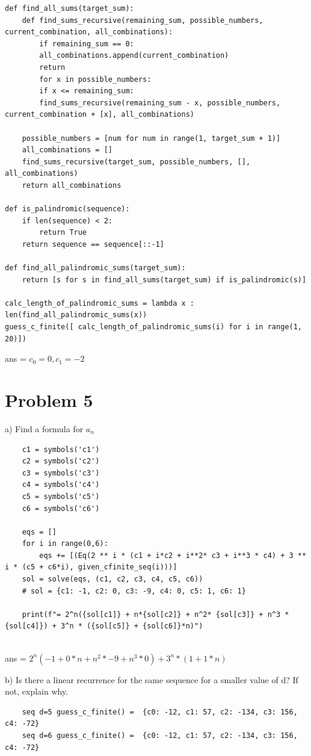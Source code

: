\documentclass{article}
\begin{document}
\begin{lstlisting}
def find_all_sums(target_sum):
	def find_sums_recursive(remaining_sum, possible_numbers, current_combination, all_combinations):
		if remaining_sum == 0:
		all_combinations.append(current_combination)
		return
		for x in possible_numbers:
		if x <= remaining_sum:
		find_sums_recursive(remaining_sum - x, possible_numbers, current_combination + [x], all_combinations)

	possible_numbers = [num for num in range(1, target_sum + 1)]
	all_combinations = []
	find_sums_recursive(target_sum, possible_numbers, [], all_combinations)
	return all_combinations

def is_palindromic(sequence):
	if len(sequence) < 2:
		return True
	return sequence == sequence[::-1]

def find_all_palindromic_sums(target_sum):
	return [s for s in find_all_sums(target_sum) if is_palindromic(s)]

calc_length_of_palindromic_sums = lambda x : len(find_all_palindromic_sums(x))
guess_c_finite([ calc_length_of_palindromic_sums(i) for i in range(1, 20)])
\end{lstlisting}

\noindent
ans = $c_0 = 0, c_1 = -2 $

\pagebreak

\section*{Problem 5}
a) Find a formula for $a_n$
\begin{lstlisting}
	c1 = symbols('c1')
	c2 = symbols('c2')
	c3 = symbols('c3')
	c4 = symbols('c4')
	c5 = symbols('c5')
	c6 = symbols('c6')
	
	eqs = []
	for i in range(0,6):
		eqs += [(Eq(2 ** i * (c1 + i*c2 + i**2* c3 + i**3 * c4) + 3 ** i * (c5 + c6*i), given_cfinite_seq(i)))]
	sol = solve(eqs, (c1, c2, c3, c4, c5, c6))
	# sol = {c1: -1, c2: 0, c3: -9, c4: 0, c5: 1, c6: 1}
	
	print(f"= 2^n({sol[c1]} + n*{sol[c2]} + n^2* {sol[c3]} + n^3 * {sol[c4]}) + 3^n * ({sol[c5]} + {sol[c6]}*n)")
	
\end{lstlisting}
ans = $2^n(-1 + 0*n + n^2 * -9 + n^3 * 0) + 3^n * (1 + 1*n)$
\vspace{20pt}

\noindent
b)
Is there a linear recurrence for the same sequence 	for a smaller value of d? If not, explain why.

\begin{lstlisting}
	seq d=5 guess_c_finite() =  {c0: -12, c1: 57, c2: -134, c3: 156, c4: -72}
	seq d=6 guess_c_finite() =  {c0: -12, c1: 57, c2: -134, c3: 156, c4: -72}
\end{lstlisting}
\end{document}
